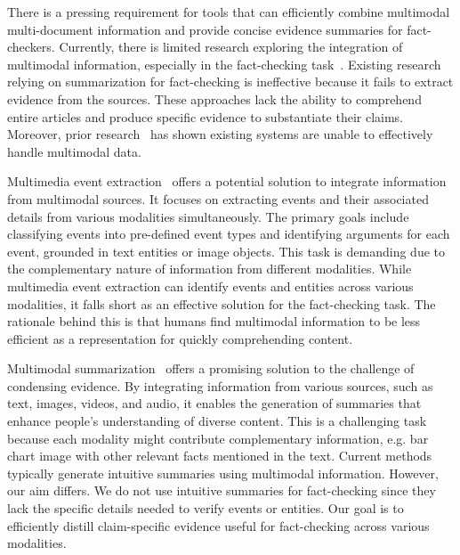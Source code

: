 There is a pressing requirement for tools that can efficiently combine multimodal multi-document information and provide concise evidence summaries for fact-checkers. Currently, there is limited research exploring the integration of multimodal information, especially in the fact-checking task~\cite{9068414}. Existing research~\cite{Das_2023,doi:10.1177,berlinski_doyl} relying on summarization for fact-checking is ineffective because it fails to extract evidence from the sources. These approaches lack the ability to comprehend entire articles and produce specific evidence to substantiate their claims. Moreover, prior research~\cite{10.1371/journal.pone.0150989} has shown existing systems are unable to effectively handle multimodal data.

Multimedia event extraction~\cite{chen2021joint,li2020crossmedia,li2020gaia,li2021documentlevel,10.1145/3503161.3548132} offers a potential solution to integrate information from multimodal sources. It focuses on extracting events and their associated details from various modalities simultaneously. The primary goals include classifying events into pre-defined event types and identifying arguments for each event, grounded in text entities or image objects. This task is demanding due to the complementary nature of information from different modalities. While multimedia event extraction can identify events and entities across various modalities, it falls short as an effective solution for the fact-checking task. The rationale behind this is that humans find multimodal information to be less efficient as a representation for quickly comprehending content.

Multimodal summarization~\cite{khullar2020mast,liu2023long,111_inproceedings,7926698} offers a promising solution to the challenge of condensing evidence. By integrating information from various sources, such as text, images, videos, and audio, it enables the generation of summaries that enhance people's understanding of diverse content. This is a challenging task because each modality might contribute complementary information, e.g. bar chart image with other relevant facts mentioned in the text. Current methods~\cite{rebuffel2019hierarchical,puduppully_data--text_2021,wang-etal-2022-robust} typically generate intuitive summaries using multimodal information. However, our aim differs. We do not use intuitive summaries for fact-checking since they lack the specific details needed to verify events or entities. Our goal is to efficiently distill claim-specific evidence useful for fact-checking across various modalities.

